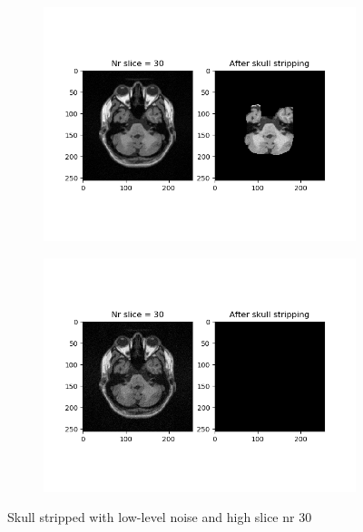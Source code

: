 \begin{figure}[H]
	\centering
	\begin{subfigure}[b]{0.35\linewidth}
		\includegraphics[scale=0.35]{figures/Module_08/M8_4.png}
	\end{subfigure}
		\begin{subfigure}[b]{0.35\linewidth}
		\includegraphics[scale=0.35]{figures/Module_08/M8_n4.png}
	\end{subfigure}
	\caption{Skull stripped with low-level noise and high slice nr 30}
	\label{fig:figures/m08_4}
\end{figure}

